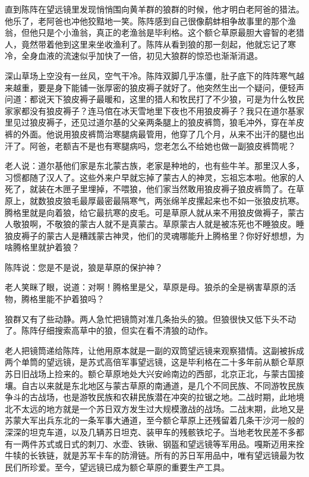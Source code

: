 \par 直到陈阵在望远镜里发现悄悄围向黄羊群的狼群的时候，他才明白老阿爸的猎法。他乐了，老阿爸也冲他狡黠地一笑。陈阵感到自己很像鹬蚌相争故事里的那个渔翁，但他只是个小渔翁，真正的老渔翁是毕利格。这个额仑草原最胆大睿智的老猎人，竟然带着他到这里来坐收渔利了。陈阵从看到狼的那一刻起，他就忘记了寒冷，全身血液的流速似乎加快了一倍，初见大狼群的惊恐也渐渐消退。
\par 
\par 深山草场上空没有一丝风，空气干冷。陈阵双脚几乎冻僵，肚子底下的阵阵寒气越来越重，要是身下能铺一张厚密的狼皮褥子就好了。他突然生出一个疑问，便轻声问道：都说天下狼皮褥子最暖和，这里的猎人和牧民打了不少狼，可是为什么牧民家家都没有狼皮褥子？连马倌在冰天雪地里下夜也不用狼皮褥子？我只在道尔基家里见过狼皮褥子，还见过道尔基的父亲两条腿上的狼皮裤筒，狼毛冲外，穿在羊皮裤的外面。他说用狼皮裤筒治寒腿病最管用，他穿了几个月，从来不出汗的腿也出汗了。阿爸，老额吉不是也有寒腿病吗，您老怎么不给她也做一副狼皮裤筒呢？
\par 老人说：道尔基他们家是东北蒙古族，老家是种地的，也有些牛羊。那里汉人多，习惯都随了汉人了。这些外来户早就忘掉了蒙古人的神灵，忘祖忘本啦。他家的人死了，就装在木匣子里埋掉，不喂狼，他们家当然敢用狼皮褥子狼皮裤筒了。在草原上，就数狼皮狼毛最厚最密最隔寒气，两张绵羊皮摞起来也不如一张狼皮抗寒。腾格里就是向着狼，给它最抗寒的皮毛。可是草原人就从来不用狼皮做褥子，蒙古人敬狼啊，不敬狼的蒙古人就不是真蒙古。草原蒙古人就是被冻死也不睡狼皮。睡狼皮褥子的蒙古人是糟践蒙古神灵，他们的灵魂哪能升上腾格里？你好好想想，为啥腾格里就护着狼？
\par 陈阵说：您是不是说，狼是草原的保护神？
\par 老人笑眯了眼，说道：对啊！腾格里是父，草原是母。狼杀的全是祸害草原的活物，腾格里能不护着狼吗？
\par 狼群又有了些动静。两人急忙把镜筒对准几条抬头的狼。但狼很快又低下头不动了。陈阵仔细搜索高草中的狼，但实在看不清狼的动作。
\par 老人把镜筒递给陈阵，让他用原本就是一副的双筒望远镜来观察猎情。这副被拆成两个单筒的望远镜，是苏式高倍军事望远镜，这是毕利格在二十多年前从额仑草原苏日旧战场上捡来的。额仑草原地处大兴安岭南边的西部，北京正北，与蒙古国接壤。自古以来就是东北地区与蒙古草原的南通道，是几个不同民族、不同游牧民族争斗的古战场，也是游牧民族和农耕民族潜在冲突的拉锯之地。二战时期，此地境北不太远的地方就是一个苏日双方发生过大规模激战的战场。二战末期，此地又是苏蒙大军出兵东北的一条军事大通道，至今额仑草原上还残留着几条干沙河一般的深深的坦克车道，以及几辆苏日坦克、装甲车的残骸铁坨子。当地老牧民差不多都有一两件苏式或日式的刺刀、水壶、铁锹、钢盔和望远镜等军用品。嘎斯迈用来拴牛犊的长铁链，就是苏军卡车的防滑链。所有的苏日军用品中，唯有望远镜最为牧民们所珍爱。至今，望远镜已成为额仑草原的重要生产工具。
